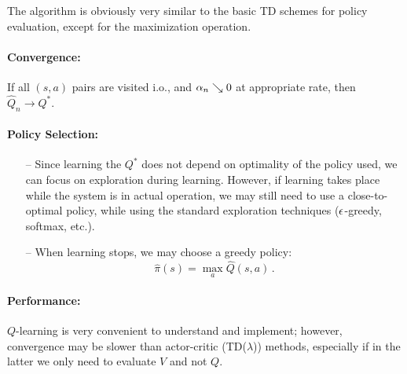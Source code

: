 The algorithm is obviously very similar to the basic TD schemes for policy evaluation,
except for the maximization operation.

\medskip
\paragraph{Convergence:}
If all $(s,a)$ pairs are visited i.o., and $\alpha_n\searrow 0$ at appropriate
rate, then $\hat Q_n \to Q^*$.

\paragraph{Policy Selection:}
\begin{itemize} \negspace
\item[--]
Since learning the $Q^*$ does not depend on optimality of the policy used, we
can focus on exploration during learning. However, if learning takes place
while the system is in actual operation, we may still need to use a
close-to-optimal policy, while using the standard exploration techniques
($\epsilon$-greedy, softmax, etc.).
\item[--]
When learning stops, we may choose a greedy policy:
$$
\hat \pi(s) = \max_a \hat Q(s,a)\,.
$$
\end{itemize}

\paragraph{Performance:}
$Q$-learning is very convenient to understand and implement; however,
convergence may be slower than actor-critic (TD($\lambda$)) methods,
especially if in the latter we only need to evaluate $V$ and  not $Q$.

%
%
